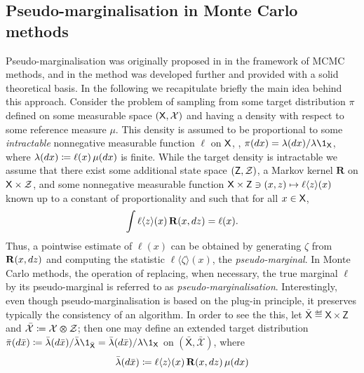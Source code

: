\subsection{Pseudo-marginalisation in Monte Carlo methods}
\label{sec:pseudo:marginalisation}

Pseudo-marginalisation was originally proposed in \cite{beaumont:2003} in the framework of MCMC methods, and in \cite{andrieu:robert:2009} the method was developed further and provided with a solid theoretical basis. In the following we recapitulate briefly the main idea behind this approach. Consider the problem of sampling from some target distribution $\pi$ defined on some measurable space $(\mathsf{X}, \mathcal{X})$ and having a density with respect to some reference measure $\mu$. This density is assumed to be proportional to some \emph{intractable} nonnegative measurable function $\ell$ on $\mathsf{X}$, \ie, $\pi(\rmd x) = \lambda(\rmd x) / \lambda \1_\Xset$, where $\lambda(d x) \coloneqq \ell(x) \, \mu(d x)$ is finite. While the target density is intractable we assume that there exist some additional state space $(\mathsf{Z}, \mathcal{Z})$, a Markov kernel $\mathbf{R}$ on $\mathsf{X} \times \mathcal{Z}$, and some nonnegative measurable function $\mathsf{X} \times \mathsf{Z} \ni (x, z) \mapsto \ell \langle z \rangle (x)$ known up to a constant of proportionality and such that for all $x \in \mathsf{X}$, 
\begin{equation} \label{eq:pseudo:marginalisation}
\int \ell \langle z \rangle(x) \, \mathbf{R}(x, \rmd z) = \ell(x). 
\end{equation}
Thus, a pointwise estimate of $\ell(x)$ can be obtained by generating $\zeta$ from $\mathbf{R}(x, d z)$ and computing the statistic $\ell \langle \zeta \rangle(x)$, the \emph{pseudo-marginal}. In Monte Carlo methods, the operation of replacing, when necessary, the true marginal $\ell$ by its pseudo-marginal is referred to as \emph{pseudo-marginalisation}. Interestingly, even though pseudo-marginalisation is based on the plug-in principle, it preserves typically the consistency of an algorithm. In order to see the this, let $\bar{\mathsf{X}} \eqdef \mathsf{X} \times \mathsf{Z}$ and $\bar{\mathcal{X}} \coloneqq \mathcal{X} \varotimes \mathcal{Z}$; then one may define an extended target distribution $\bar{\pi}(\rmd \bar{x}) \eqdef \bar{\lambda}(\rmd \bar{x}) / \bar{\lambda} \1_{\bar{\mathsf{X}}} = \bar{\lambda}(\rmd \bar{x}) / \lambda \1_{\mathsf{X}}$ on $(\bar{\mathsf{X}}, \bar{\mathcal{X}})$, where 
\begin{equation} \label{eq:extended:target}
\bar{\lambda}(\rmd \bar{x}) \eqdef \ell \langle z \rangle(x) \, \kernel{R}(x, \rmd z) \, \mu(\rmd x)
\end{equation}
